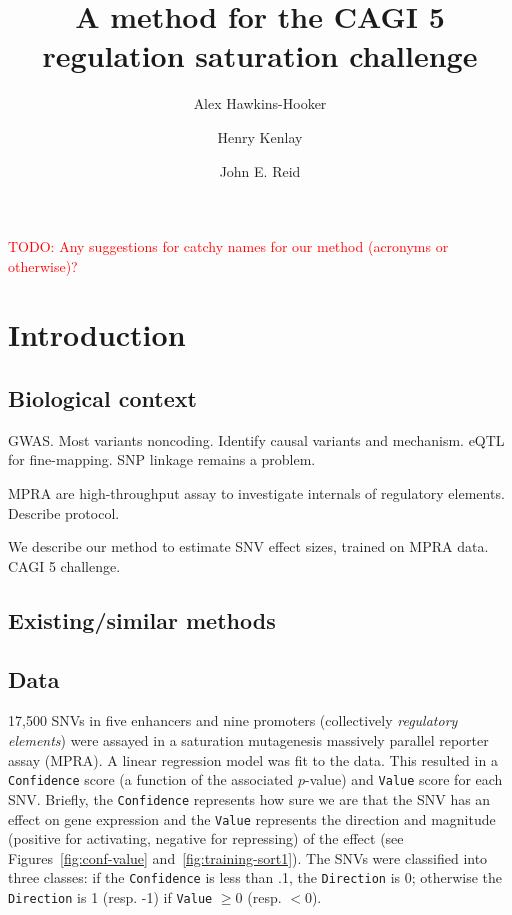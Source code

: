 \documentclass{article}
\author[1]{Alex Hawkins-Hooker}
\author[2]{Henry Kenlay}
\author[3, 4]{John E. Reid}
\affil[1]{\footnotesize \todo{add}}
\affil[2]{\footnotesize \todo{add}}
\affil[3]{\footnotesize MRC Biostatistics Unit, University of Cambridge, Cambridge, UK}
\affil[4]{\footnotesize Alan Turing Institute, British Library, London, UK}
\title{A method for the CAGI 5 regulation saturation challenge}
\newcommand{\todo}[1]{\textcolor{red}{TODO: #1}}
\begin{document}
\maketitle


\todo{Any suggestions for catchy names for our method (acronyms or otherwise)?}


\section*{Introduction}

\subsection*{Biological context}

GWAS. Most variants noncoding. Identify causal variants and mechanism. eQTL for
fine-mapping. SNP linkage remains a problem.

MPRA are high-throughput assay to investigate internals of regulatory elements.
Describe protocol.

We describe our method to estimate SNV effect sizes, trained on MPRA data. CAGI
5 challenge.


\subsection*{Existing/similar methods}


\subsection*{Data}

17,500 SNVs in five enhancers and nine promoters (collectively \emph{regulatory
elements}) were assayed in a saturation mutagenesis massively parallel reporter
assay (MPRA). A linear regression model was fit to the data. This resulted in a
\texttt{Confidence} score (a function of the associated $p$-value) and
\texttt{Value} score for each SNV. Briefly, the \texttt{Confidence} represents
how sure we are that the SNV has an effect on gene expression and the
\texttt{Value} represents the direction and magnitude (positive for activating,
negative for repressing) of the effect (see Figures~\ref{fig:conf-value}
and~\ref{fig:training-sort1}). The SNVs were classified into three classes: if
the \texttt{Confidence} is less than .1, the \texttt{Direction} is 0; otherwise
the \texttt{Direction} is 1 (resp. -1) if \texttt{Value} $\ge 0$ (resp. $< 0$).
\end{document}
